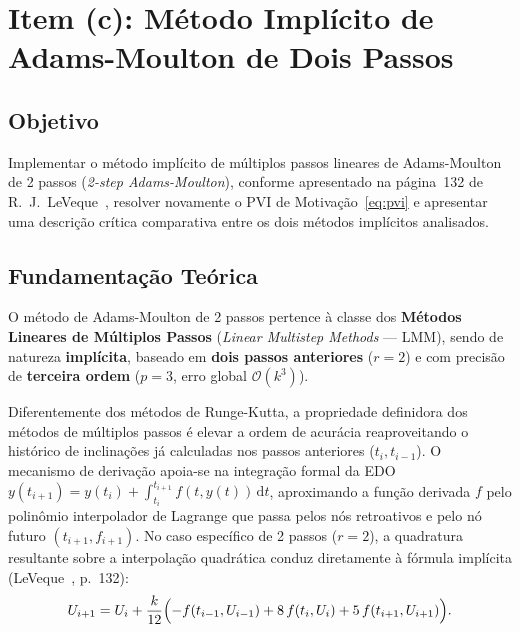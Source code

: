 \documentclass[12pt, a4paper]{article}
\begin{document}
\section{Item (c): Método Implícito de Adams-Moulton de Dois Passos}
\label{sec:item-c}

\subsection{Objetivo}

Implementar o método implícito de múltiplos passos lineares de Adams-Moulton de 2 passos (\emph{2-step Adams-Moulton}),
conforme apresentado na página~132 de R.~J.~LeVeque~\cite{leveque2007}, resolver novamente o PVI de
Motivação~\eqref{eq:pvi} e apresentar uma descrição crítica comparativa entre os dois métodos implícitos analisados.

\subsection{Fundamentação Teórica}
\label{sec:c-teoria}
O método de Adams-Moulton de 2 passos pertence à classe dos \textbf{Métodos Lineares de Múltiplos Passos} (\emph{Linear Multistep Methods} — LMM), sendo de natureza \textbf{implícita}, baseado em \textbf{dois passos anteriores} ($r = 2$) e com precisão de \textbf{terceira ordem} ($p = 3$, erro global $\mathcal{O}(k^3)$).

Diferentemente dos métodos de Runge-Kutta, a propriedade definidora dos métodos de múltiplos passos é elevar a ordem de acurácia reaproveitando o histórico de inclinações já calculadas nos passos anteriores ($t_i, t_{i-1}$). O mecanismo de derivação apoia-se na integração formal da EDO $y(t_{i+1}) = y(t_i) + \int_{t_i}^{t_{i+1}} f(t, y(t))\,\mathrm{d}t$, aproximando a função derivada $f$ pelo polinômio interpolador de Lagrange que passa pelos nós retroativos e pelo nó futuro $(t_{i+1}, f_{i+1})$. No caso específico de 2 passos ($r = 2$), a quadratura resultante sobre a interpolação quadrática conduz diretamente à fórmula implícita (LeVeque~\cite{leveque2007}, p.~132):
\begin{equation}\label{eq:am2}
  U_{i+1} = U_i + \frac{k}{12}\Bigl(-f(t_{i-1}, U_{i-1}) + 8\,f(t_i, U_i) + 5\,f(t_{i+1}, U_{i+1})\Bigr).
\end{equation}
\end{document}
